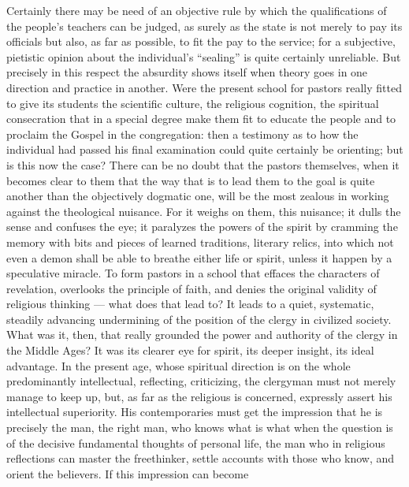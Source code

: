 \documentclass[12pt]{book}
\newcommand{\opage}[1]{\marginnote{\footnotesize\textit{[#1]}}}
\begin{document}
Certainly there may be need of an objective rule by which the
qualifications of the people's teachers can be judged, as surely as the
state is not merely to pay its officials but also, as far as possible, to
fit the pay to the service; for a subjective, pietistic opinion about the
individual's ``sealing'' is quite certainly unreliable. But precisely in
this
\opage{291}\setcounter{footnote}{0}%
respect the absurdity shows itself when theory goes in one direction and
practice in another. Were the present school for pastors really fitted to
give its students the scientific culture, the religious cognition, the
spiritual consecration that in a special degree make them fit to educate
the people and to proclaim the Gospel in the congregation: then a
testimony as to how the individual had passed his final examination could
quite certainly be orienting; but is this now the case? There can be no
doubt that the pastors themselves, when it becomes clear to them that the
way that is to lead them to the goal is quite another than the
objectively dogmatic one, will be the most zealous in working against the
theological nuisance. For it weighs on them, this nuisance; it dulls the
sense and confuses the eye; it paralyzes the powers of the spirit by
cramming the memory with bits and pieces of learned traditions, literary
relics, into which not even a demon shall be able to breathe either life
or spirit, unless it happen by a speculative miracle. To form pastors in a
school that effaces the characters of revelation, overlooks the principle
of faith, and denies the original validity of religious thinking --- what
does that lead to? It leads to a quiet, systematic, steadily advancing
undermining of the position of the clergy in civilized society. What was
it, then, that really grounded the power and authority of the clergy
in the Middle Ages? It was its clearer eye for spirit, its deeper insight,
its ideal advantage. In the present age, whose spiritual direction is on
the whole predominantly intellectual, reflecting, criticizing, the
clergyman must not merely manage to keep up, but, as far as the religious
is concerned, expressly assert his intellectual superiority. His
contemporaries must get the impression that he is precisely the man, the
right man, who knows what is what when the question is
\opage{292}\setcounter{footnote}{0}%
of the decisive fundamental thoughts of personal life, the man who in
religious reflections can master the freethinker, settle accounts with
those who know, and orient the believers. If this impression can become
\end{document}
